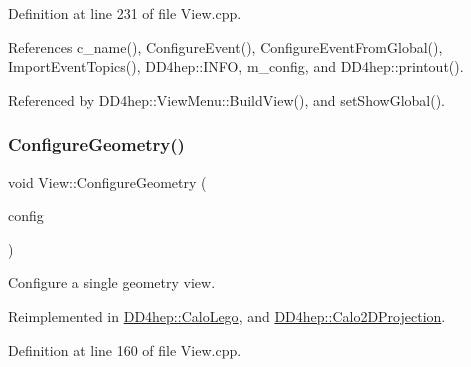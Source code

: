 Definition at line 231 of file View.\+cpp.



References c\+\_\+name(), Configure\+Event(), Configure\+Event\+From\+Global(), Import\+Event\+Topics(), D\+D4hep\+::\+I\+N\+FO, m\+\_\+config, and D\+D4hep\+::printout().



Referenced by D\+D4hep\+::\+View\+Menu\+::\+Build\+View(), and set\+Show\+Global().

\hypertarget{class_d_d4hep_1_1_view_adefb4cb817819ec62803d34b89bf0988}{}\label{class_d_d4hep_1_1_view_adefb4cb817819ec62803d34b89bf0988} 
\subsubsection{\texorpdfstring{Configure\+Geometry()}{ConfigureGeometry()}}
{\footnotesize\ttfamily void View\+::\+Configure\+Geometry (\begin{DoxyParamCaption}\item[{const \hyperlink{class_d_d4hep_1_1_display_configuration_1_1_view_config}{Display\+Configuration\+::\+View\+Config} \&}]{config }\end{DoxyParamCaption})\hspace{0.3cm}{\ttfamily [virtual]}}



Configure a single geometry view. 



Reimplemented in \hyperlink{class_d_d4hep_1_1_calo_lego_aca92ae6d2fe4e24a928fa23dbe755d19}{D\+D4hep\+::\+Calo\+Lego}, and \hyperlink{class_d_d4hep_1_1_calo2_d_projection_aabf1a03b64b1baad596aaa9349e3cbea}{D\+D4hep\+::\+Calo2\+D\+Projection}.



Definition at line 160 of file View.\+cpp.



